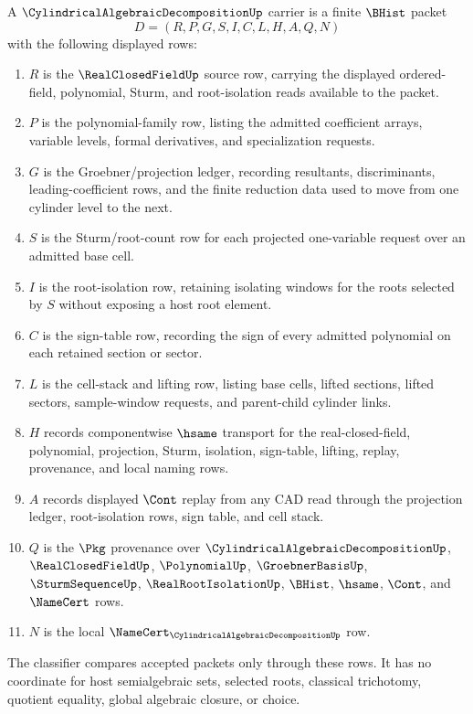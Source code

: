 \begin{definition}
\label{def:cylindrical-algebraic-decomposition-carrier}
A $\CylindricalAlgebraicDecompositionUp$ carrier is a finite $\BHist$ packet
$$
D=(R,P,G,S,I,C,L,H,A,Q,N)
$$
with the following displayed rows:
\begin{enumerate}
\item $R$ is the $\RealClosedFieldUp$ source row, carrying the displayed ordered-field, polynomial, Sturm, and root-isolation reads available to the packet.
\item $P$ is the polynomial-family row, listing the admitted coefficient arrays, variable levels, formal derivatives, and specialization requests.
\item $G$ is the Groebner/projection ledger, recording resultants, discriminants, leading-coefficient rows, and the finite reduction data used to move from one cylinder level to the next.
\item $S$ is the Sturm/root-count row for each projected one-variable request over an admitted base cell.
\item $I$ is the root-isolation row, retaining isolating windows for the roots selected by $S$ without exposing a host root element.
\item $C$ is the sign-table row, recording the sign of every admitted polynomial on each retained section or sector.
\item $L$ is the cell-stack and lifting row, listing base cells, lifted sections, lifted sectors, sample-window requests, and parent-child cylinder links.
\item $H$ records componentwise $\hsame$ transport for the real-closed-field, polynomial, projection, Sturm, isolation, sign-table, lifting, replay, provenance, and local naming rows.
\item $A$ records displayed $\Cont$ replay from any CAD read through the projection ledger, root-isolation rows, sign table, and cell stack.
\item $Q$ is the $\Pkg$ provenance over $\CylindricalAlgebraicDecompositionUp$, $\RealClosedFieldUp$, $\PolynomialUp$, $\GroebnerBasisUp$, $\SturmSequenceUp$, $\RealRootIsolationUp$, $\BHist$, $\hsame$, $\Cont$, and $\NameCert$ rows.
\item $N$ is the local $\NameCert_{\CylindricalAlgebraicDecompositionUp}$ row.
\end{enumerate}
The classifier compares accepted packets only through these rows. It has no coordinate for host semialgebraic sets, selected roots, classical trichotomy, quotient equality, global algebraic closure, or choice.
\end{definition}

